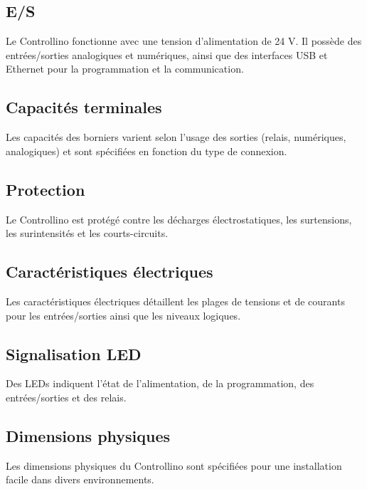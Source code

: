 \documentclass[a4paper,12pt]{report}
\begin{document}
\subsection{E/S}
Le Controllino fonctionne avec une tension d'alimentation de 24 V. Il possède des entrées/sorties analogiques et numériques, ainsi que des interfaces USB et Ethernet pour la programmation et la communication.

\subsection{Capacités terminales}
Les capacités des borniers varient selon l'usage des sorties (relais, numériques, analogiques) et sont spécifiées en fonction du type de connexion.

\subsection{Protection}
Le Controllino est protégé contre les décharges électrostatiques, les surtensions, les surintensités et les courts-circuits.

\subsection{Caractéristiques électriques}
Les caractéristiques électriques détaillent les plages de tensions et de courants pour les entrées/sorties ainsi que les niveaux logiques.

\subsection{Signalisation LED}
Des LEDs indiquent l'état de l'alimentation, de la programmation, des entrées/sorties et des relais.

\subsection{Dimensions physiques}
Les dimensions physiques du Controllino sont spécifiées pour une installation facile dans divers environnements.
\end{document}
